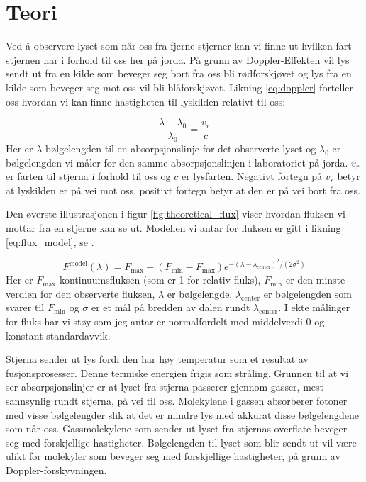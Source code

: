 \documentclass[reprint, english,notitlepage]{revtex4-1}  %
\begin{document}
\section{Teori}

Ved å observere lyset som når oss fra fjerne stjerner kan vi finne ut hvilken fart stjernen har i
 forhold til oss her på jorda. På grunn av Doppler-Effekten vil lys sendt ut fra en kilde som
 beveger seg bort fra oss bli rødforskjøvet og lys fra en kilde som beveger seg mot oss vil bli
 blåforskjøvet. Likning \ref{eq:doppler} forteller oss hvordan vi kan finne hastigheten til
 lyskilden relativt til oss:

\begin{equation}
  \label{eq:doppler}
  \frac{\lambda - \lambda_0}{\lambda_0} = \frac{v_r}{c}
\end{equation}
Her er $\lambda$ bølgelengden til en absorpsjonslinje for det observerte lyset og $\lambda_0$ er
 bølgelengden vi måler for den samme absorpsjonslinjen i laboratoriet på jorda. $v_r$ er farten
 til stjerna i forhold til oss og $c$ er lysfarten. Negativt fortegn på $v_r$ betyr at lyskilden er på vei mot oss, positivt fortegn betyr at den er på vei bort fra oss.

Den øverste illustrasjonen i figur \ref{fig:theoretical_flux} viser hvordan fluksen vi mottar fra
 en stjerne kan se ut. Modellen vi antar for fluksen er gitt i likning \ref{eq:flux_model}, se
 \citep{part1D}.

\begin{equation}
  \label{eq:flux_model}
  F^{\text{model}}(\lambda) = F_{\text{max}} + (F_{\text{min}} - F_{\text{max}}) e^{-(\lambda - \lambda_{\text{center}})^2/(2 \sigma^2)}
\end{equation}
Her er $F_{\text{max}}$ kontinuumsfluksen (som er 1 for relativ fluks), $F_{\text{min}}$ er den minste verdien
 for den observerte fluksen, $\lambda$ er bølgelengde, $\lambda_{\text{center}}$ er bølgelengden som
 svarer til $F_{\text{min}}$ og $\sigma$ er et mål på bredden av dalen rundt $\lambda_{\text{center}}$. I
 ekte målinger for fluks har vi støy som jeg antar er normalfordelt med middelverdi 0 og konstant standardavvik.

Stjerna sender ut lys fordi den har høy temperatur som et resultat av fusjonsprosesser. Denne termiske energien frigis som stråling. Grunnen til at vi ser absorpsjonslinjer er at lyset fra stjerna passerer gjennom gasser, mest sannsynlig rundt stjerna, på vei til oss. Molekylene i gassen absorberer fotoner med visse bølgelengder slik at det er mindre lys med akkurat disse bølgelengdene som når oss. Gassmolekylene som sender ut lyset fra stjernas overflate beveger seg med forskjellige hastigheter. Bølgelengden til lyset som blir sendt ut vil være ulikt for molekyler som beveger seg med forskjellige hastigheter, på grunn av Doppler-forskyvningen.
\end{document}
